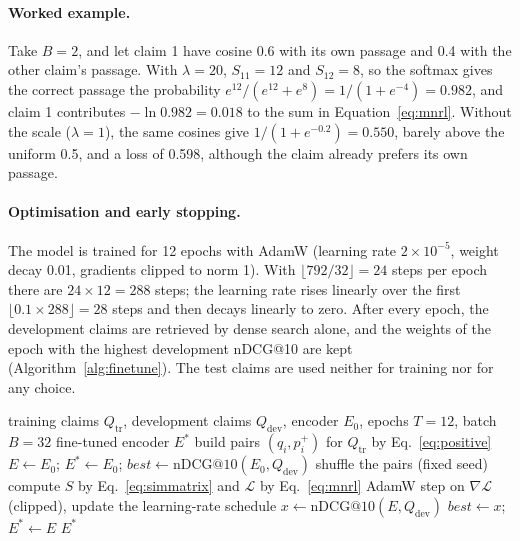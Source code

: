 \paragraph{Worked example.} Take $B = 2$, and let claim 1 have cosine 0.6 with its own passage
and 0.4 with the other claim's passage. With $\lambda = 20$, $S_{11} = 12$ and $S_{12} = 8$, so
the softmax gives the correct passage the probability
$e^{12} / (e^{12} + e^{8}) = 1 / (1 + e^{-4}) = 0.982$, and claim 1 contributes
$-\ln 0.982 = 0.018$ to the sum in Equation~\eqref{eq:mnrl}. Without the scale ($\lambda = 1$),
the same cosines give $1 / (1 + e^{-0.2}) = 0.550$, barely above the uniform 0.5, and a loss of
0.598, although the claim already prefers its own passage.

\paragraph{Optimisation and early stopping.} The model is trained for 12 epochs with AdamW
\parencite{loshchilov2019adamw} (learning rate $2 \times 10^{-5}$, weight decay 0.01, gradients
clipped to norm 1). With $\lfloor 792 / 32 \rfloor = 24$ steps per epoch there are
$24 \times 12 = 288$ steps; the learning rate rises linearly over the first
$\lfloor 0.1 \times 288 \rfloor = 28$ steps and then decays linearly to zero. After every epoch,
the development claims are retrieved by dense search alone, and the weights of the epoch with
the highest development nDCG@10 are kept (Algorithm~\ref{alg:finetune}). The test claims are
used neither for training nor for any choice.

\begin{algorithm}[t]
\caption{In-domain fine-tuning with in-batch negatives and early stopping}
\label{alg:finetune}
\begin{algorithmic}[1]
\Require training claims $Q_{\mathrm{tr}}$, development claims $Q_{\mathrm{dev}}$, encoder $E_0$, epochs $T = 12$, batch $B = 32$
\Ensure fine-tuned encoder $E^{\ast}$
\State build pairs $(q_i, p_i^{+})$ for $Q_{\mathrm{tr}}$ by Eq.~\eqref{eq:positive}
\State $E \gets E_0$; $E^{\ast} \gets E_0$; $\mathit{best} \gets \mathrm{nDCG@10}(E_0, Q_{\mathrm{dev}})$
  \State shuffle the pairs (fixed seed)
    \State compute $S$ by Eq.~\eqref{eq:simmatrix} and $\mathcal{L}$ by Eq.~\eqref{eq:mnrl}
    \State AdamW step on $\nabla \mathcal{L}$ (clipped), update the learning-rate schedule
  \EndFor
  \State $x \gets \mathrm{nDCG@10}(E, Q_{\mathrm{dev}})$ 
   $\mathit{best} \gets x$; $E^{\ast} \gets E$ \EndIf
\EndFor
\State \Return $E^{\ast}$
\end{algorithmic}
\end{algorithm}

